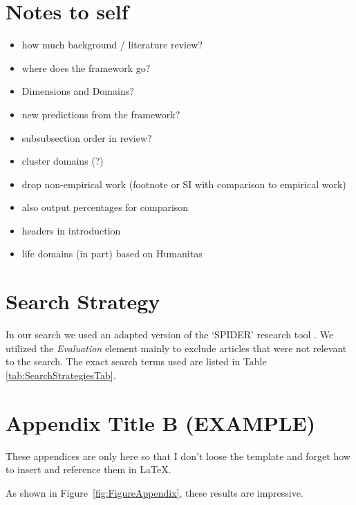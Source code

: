 \documentclass[man, 12pt, a4paper]{apa7}
\begin{document}
\section{Notes to self}
\begin{itemize}
  \item how much background / literature review?
  \item where does the framework go?
  \item Dimensions and Domains?
  \item new predictions from the framework?
  \item subsubsection order in review?
  \item cluster domains (?)
  \item drop non-empirical work (footnote or SI with comparison to empirical work)
  \item also output percentages for comparison
  \item headers in introduction
  \item life domains (in part) based on Humanitas
\end{itemize}

\printbibliography

\appendix

\section{Search Strategy}
\label{app:AppendixSearchStrategy}

In our search we used an adapted version of the `SPIDER' research tool \citep[e.g.,][]{Cooke2012}. We utilized the \textit{Evaluation} element mainly to exclude articles that were not relevant to the search. The exact search terms used are listed in Table \ref{tab:SearchStrategiesTab}.




\section{Appendix Title B (EXAMPLE)}
\label{app:AppendixLableB}

These appendices are only here so that I don't loose the template and forget how to insert and reference them in \LaTeX.

As shown in Figure~\ref{fig:FigureAppendix}, these results are impressive. 
\end{document}
